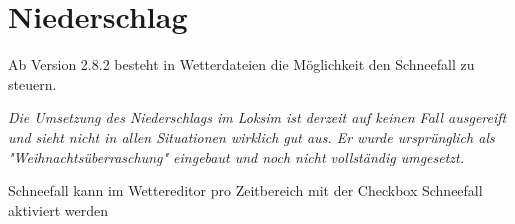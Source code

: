 \section{Niederschlag}

Ab Version 2.8.2 besteht in Wetterdateien die Möglichkeit den Schneefall
zu steuern.

\emph{Die Umsetzung des Niederschlags im Loksim ist derzeit auf keinen
Fall ausgereift und sieht nicht in allen Situationen wirklich gut aus.
Er wurde ursprünglich als "Weihnachtsüberraschung" eingebaut und noch
nicht vollständig umgesetzt.}

Schneefall kann im Wettereditor pro Zeitbereich mit der Checkbox
Schneefall aktiviert werden
